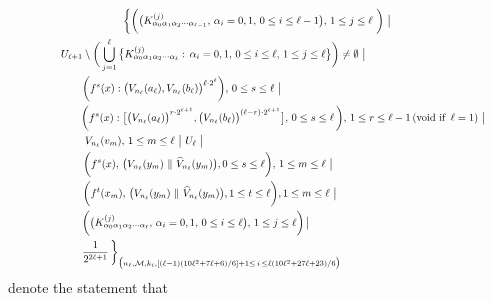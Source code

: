 \documentclass[12pt]{article}
\newcommand{\al}{\alpha}
\begin{document}
\begin{multline*}
$$
\bigg\{ \bigg( \big(K_{\al_0\al_1\al_2\cdots \al_{\ell-1}}^{(j)}, \, \al_i = 0, 1, \, 0 \le i \le \ell-1 \big), \, 1 \le j \le \ell \,\, \bigg) \,\, \big| \,\,\, \\ 
\qquad\qquad\quad U_{\ell+1} \setminus \bigg( \bigcup_{j=1}^\ell \big\{ K_{\al_0\al_1\al_2\cdots\al_{\ell}}^{(j)}: \, \al_i = 0, 1, \, 0 \le i \le \ell, \, 1 \le j \le \ell \big\} \bigg) \ne \emptyset \,\, \big| \quad\qquad\qquad\qquad\qquad\qquad\quad\quad\,\,\,\,\, \\  
\,\, \bigg(f^s(x) : \big(V_{n_\ell}(a_\ell), V_{n_\ell}(b_\ell)\big)^{\ell \cdot 2^\ell}\bigg), \, 0 \le s \le \ell \,\, \big| \qquad\qquad\qquad\qquad\qquad\qquad\qquad\quad\, \\
\qquad\qquad\,\,\, \bigg(f^s(x) : \big[\big(V_{n_\ell}(a_\ell)\big)^{r \cdot 2^{\ell+1}}, \big(V_{n_\ell}(b_\ell)\big)^{(\ell-r) \cdot 2^{\ell+1}} \big], \, 0 \le s \le \ell \, \bigg), \, 1 \le r \le \ell-1 \, (\text{void if} \,\,\, \ell = 1) \,\, \big| \\
V_{n_\ell}(v_m), \, 1 \le m \le \ell \,\, \big| \,\, U_\ell \,\, \big|\qquad\qquad\qquad\qquad\qquad\qquad\qquad\qquad\qquad\qquad\qquad \\   
\,\, \bigg(f^{s}(x), \, \big(V_{n_\ell}(y_m) \,\, \| \,\, \widehat V_{n_\ell}(y_m)\big), 0 \le s \le \ell\bigg), \, 1 \le m \le \ell \,\, \big| \qquad\qquad\qquad\qquad\quad\quad\, \\ 
\qquad \bigg(f^t(x_m), \, \big(V_{n_\ell}(y_m) \,\, \| \,\, \widehat V_{n_\ell}(y_m)\big), 1 \le t \le \ell\bigg), 1 \le m \le \ell \,\, \big| \qquad\qquad\qquad\qquad\qquad\quad\,\,\, \\ 
\bigg(\big(K_{\al_0\al_1\al_2\cdots \al_{\ell}}^{(j)}, \, \al_i = 0, 1, \, 0 \le i \le \ell\big), \, 1 \le j \le \ell\bigg) \, \big| \qquad\qquad\qquad\qquad\qquad\qquad\, \\ 
\qquad \frac 1{2^{2\ell+1}} \, \bigg\}_{\big(n_\ell,\mathcal M,k_i, [(\ell-1)(10\ell^2+7\ell+6)/6]+1 \le \, i \, \le \ell(10\ell^2+27\ell+23)/6\big)}\,\,\qquad\qquad\qquad\qquad\qquad\,\,\,\,\,
$$
\end{multline*}
denote the statement that 
\end{document}
